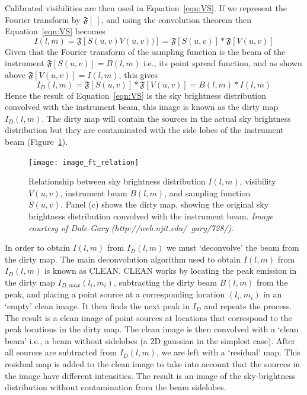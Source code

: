 Calibrated visibilities are then used in Equation~\ref{eqn:VS}. If we represent the Fourier transform by $\mathfrak{F}[~]$, and using the convolution theorem then Equation~\ref{eqn:VS} becomes
\begin{equation}
I(l,m)=\mathfrak{F}[S(u,v)V(u,v))] = \mathfrak{F}[S(u,v)]\ast\mathfrak{F}[V(u,v)]
\label{eqn:VS2}
\end{equation}
Given that the Fourier transform of the sampling function is the beam of the instrument $\mathfrak{F}[S(u,v)] = B(l,m)$ i.e., its point spread function, and as shown above $\mathfrak{F}[V(u,v)] = I(l,m)$, this gives
\begin{equation}
I_D(l,m) = \mathfrak{F}[S(u,v)]\ast\mathfrak{F}[V(u,v)] = B(l,m) \ast I(l,m)
\label{eqn:convol}
\end{equation}
Hence the result of Equation~\ref{eqn:VS} is the sky brightness distribution convolved with the instrument beam, this image is known as the dirty map $I_D(l,m)$. The dirty map will contain the sources in the actual sky brightness distribution but they are contaminated with the side lobes of the instrument beam (Figure~\ref{fig:IVSB}). 
\begin{figure}[!t]
\begin{center}
\texttt{[image: image\_ft\_relation]}
\caption[Sky brightness, visibility, beam, and sampling function]{Relationship between sky brightness distribution $I(l,m)$, visibility $V(u,v)$, instrument beam $B(l,m)$, and sampling function $S(u,v)$. Panel (c) shows the dirty map, showing the original sky brightness distribution convolved with the instrument beam. {\it Image courtesy of Dale Gary (http://web.njit.edu/~gary/728/)}.}
\label{fig:IVSB}
\end{center}
\end{figure}
In order to obtain $I(l,m)$ from $I_D(l,m)$ we must `deconvolve' the beam from the dirty map. The main deconvolution algorithm used to obtain $I(l,m)$ from $I_D(l,m)$ is known as CLEAN. CLEAN works by locating the peak emission in the dirty map $I_{D, max}(l_i,m_i)$, subtracting the dirty beam $B(l,m)$ from the peak, and placing a point source at a corresponding location $(l_i,m_i)$ in an `empty' clean image. It then finds the next peak in $I_D$ and repeats the process. The result is a clean image of point sources at locations that correspond to the peak locations in the dirty map. The clean image is then convolved with a `clean beam' i.e., a beam without sidelobes (a 2D gaussian in the simplest case). After all sources are subtracted from $I_D(l,m)$, we are left with a `residual' map. This residual map is added to the clean image to take into account that the sources in the image have different intensities. The result is an image of the sky-brightness distribution without contamination from the beam sidelobes.


